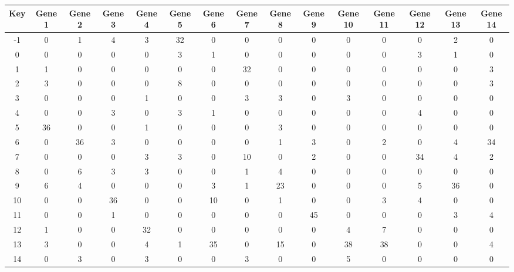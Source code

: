 \begin{tabular}{|c|c|c|c|c|c|c|c|c|c|c|c|c|c|c|}
\hline
Key & Gene 1 & Gene 2 & Gene 3 & Gene 4 & Gene 5 & Gene 6 & Gene 7 & Gene 8 & Gene 9 & Gene 10 & Gene 11 & Gene 12 & Gene 13 & Gene 14 \\
\hline
-1 & 0 & 1 & 4 & 3 & 32 & 0 & 0 & 0 & 0 & 0 & 0 & 0 & 2 & 0 \\
0 & 0 & 0 & 0 & 0 & 3 & 1 & 0 & 0 & 0 & 0 & 0 & 3 & 1 & 0 \\
1 & 1 & 0 & 0 & 0 & 0 & 0 & 32 & 0 & 0 & 0 & 0 & 0 & 0 & 3 \\
2 & 3 & 0 & 0 & 0 & 8 & 0 & 0 & 0 & 0 & 0 & 0 & 0 & 0 & 3 \\
3 & 0 & 0 & 0 & 1 & 0 & 0 & 3 & 3 & 0 & 3 & 0 & 0 & 0 & 0 \\
4 & 0 & 0 & 3 & 0 & 3 & 1 & 0 & 0 & 0 & 0 & 0 & 4 & 0 & 0 \\
5 & 36 & 0 & 0 & 1 & 0 & 0 & 0 & 3 & 0 & 0 & 0 & 0 & 0 & 0 \\
6 & 0 & 36 & 3 & 0 & 0 & 0 & 0 & 1 & 3 & 0 & 2 & 0 & 4 & 34 \\
7 & 0 & 0 & 0 & 3 & 3 & 0 & 10 & 0 & 2 & 0 & 0 & 34 & 4 & 2 \\
8 & 0 & 6 & 3 & 3 & 0 & 0 & 1 & 4 & 0 & 0 & 0 & 0 & 0 & 0 \\
9 & 6 & 4 & 0 & 0 & 0 & 3 & 1 & 23 & 0 & 0 & 0 & 5 & 36 & 0 \\
10 & 0 & 0 & 36 & 0 & 0 & 10 & 0 & 1 & 0 & 0 & 3 & 4 & 0 & 0 \\
11 & 0 & 0 & 1 & 0 & 0 & 0 & 0 & 0 & 45 & 0 & 0 & 0 & 3 & 4 \\
12 & 1 & 0 & 0 & 32 & 0 & 0 & 0 & 0 & 0 & 4 & 7 & 0 & 0 & 0 \\
13 & 3 & 0 & 0 & 4 & 1 & 35 & 0 & 15 & 0 & 38 & 38 & 0 & 0 & 4 \\
14 & 0 & 3 & 0 & 3 & 0 & 0 & 3 & 0 & 0 & 5 & 0 & 0 & 0 & 0 \\
\hline
\end{tabular}
